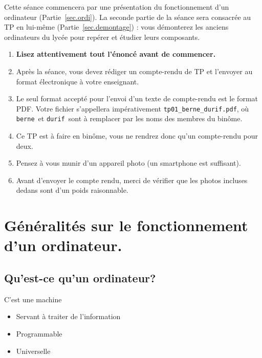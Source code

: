 %
%

\begin{multicols}{2}
Cette séance commencera par une présentation du fonctionnement d'un ordinateur (Partie~\ref{sec.ordi}). 
La seconde partie de la séance sera consacrée au TP en lui-même (Partie~\ref{sec.demontage}) : vous 
démonterez les anciens ordinateurs du lycée pour repérer et étudier leurs composants. 

\begin{enumerate}
\item  \textbf{Lisez attentivement  tout l'énoncé
    avant de commencer.}
\item Après la séance, vous devez rédiger un compte-rendu de TP et
l'envoyer au format électronique à votre enseignant.
\item Le seul format accepté pour l'envoi d'un texte de compte-rendu est le
format PDF. Votre fichier s'appellera impérativement \texttt{tp01\_berne\_durif.pdf}, où \og \texttt{berne}\fg\ et \og \texttt{durif}\fg\ sont à remplacer par les noms des membres du binôme. 
\item Ce TP est à faire en binôme, vous ne rendrez donc qu'un
  compte-rendu pour deux.
\item Pensez à vous munir d'un appareil photo (un smartphone est suffisant).
\item Avant d'envoyer le compte rendu, merci de vérifier que les photos incluses dedans sont d'un poids raisonnable.
\end{enumerate}


\section*{Généralités sur le fonctionnement d'un ordinateur.}\label{sec.ordi}

\subsection*{Qu'est-ce qu'un ordinateur?}

C'est une machine
\begin{itemize}
\item Servant à traiter de l'information
\item Programmable
\item Universelle
\end{itemize}


\end{multicols}
